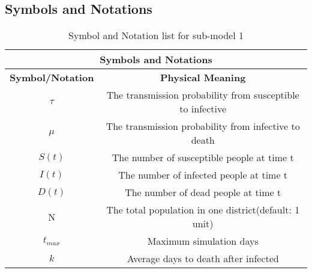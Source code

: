 \subsection{Symbols and Notations}
\begin{table}[htbp]
\centering
\caption{Symbol and Notation list for sub-model 1}
\begin{tabular}{|c|c|c|c|c|c|c|}
\hline
                                      \multicolumn{ 7}{|c|}{{\bf Symbols and Notations}} \\
\hline
\multicolumn{ 2}{|c|}{{\bf Symbol/Notation}} &                  \multicolumn{ 5}{|c|}{{\bf Physical Meaning}} \\
\hline
\multicolumn{ 2}{|c|}{$\tau$} & \multicolumn{ 5}{|c|}{The transmission probability from susceptible to infective} \\
\hline
\multicolumn{ 2}{|c|}{$\mu$} & \multicolumn{ 5}{|c|}{The transmission probability from infective to death} \\
\hline
\multicolumn{ 2}{|c|}{$S(t)$} & \multicolumn{ 5}{|c|}{The number of susceptible people at time t} \\
\hline
\multicolumn{ 2}{|c|}{$I(t)$} & \multicolumn{ 5}{|c|}{The number of infected people at time t} \\
\hline
\multicolumn{ 2}{|c|}{$D(t)$} &     \multicolumn{ 5}{|c|}{The number of dead people at time t} \\
\hline
\multicolumn{ 2}{|c|}{N} & \multicolumn{ 5}{|c|}{The total population in one district(default: 1 unit)} \\
\hline
\multicolumn{ 2}{|c|}{$t_{max}$} &                 \multicolumn{ 5}{|c|}{Maximum simulation days} \\
\hline
\multicolumn{ 2}{|c|}{$k$} &    \multicolumn{ 5}{|c|}{Average days to death after infected} \\
\hline
\end{tabular}  

\end{table}
